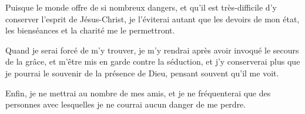 \documentclass[instructions.tex]{subfiles}
\begin{document}
\primo Puisque le monde offre de si nombreux dangers, et qu'il est très-difficile d'y conserver l'esprit de Jésus-Christ, je l'éviterai autant que les devoirs de mon état, les bienséances et la charité me le permettront.

\secundo Quand je serai forcé de m'y trouver, je m'y rendrai après avoir invoqué le secours de la grâce, et m'être mis en garde contre la séduction, et j'y conserverai plus que je pourrai le souvenir de la présence de Dieu, pensant souvent qu'il me voit.

\tertio Enfin, je ne mettrai au nombre de mes amis, et je ne fréquenterai que des personnes avec lesquelles je ne courrai aucun danger de me perdre.

 
\end{document}
